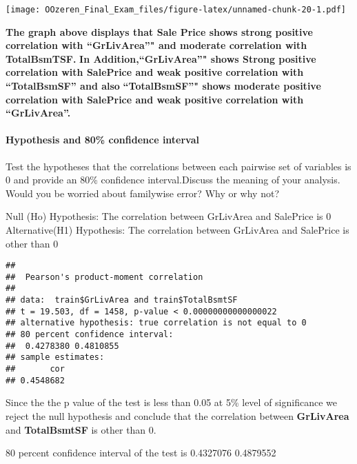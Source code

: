 \documentclass[]{article}
\newenvironment{Shaded}{\begin{snugshade}}{\end{snugshade}}
\newcommand{\KeywordTok}[1]{\textcolor[rgb]{0.13,0.29,0.53}{\textbf{#1}}}
\newcommand{\DataTypeTok}[1]{\textcolor[rgb]{0.13,0.29,0.53}{#1}}
\newcommand{\FloatTok}[1]{\textcolor[rgb]{0.00,0.00,0.81}{#1}}
\newcommand{\OperatorTok}[1]{\textcolor[rgb]{0.81,0.36,0.00}{\textbf{#1}}}
\newcommand{\NormalTok}[1]{#1}
\let\oldparagraph\paragraph
\renewcommand{\paragraph}[1]{\oldparagraph{#1}\mbox{}}
\begin{document}
\texttt{[image: OOzeren\_Final\_Exam\_files/figure-latex/unnamed-chunk-20-1.pdf]}

\textbf{The graph above displays that Sale Price shows strong positive
correlation with ``GrLivArea''" and moderate correlation with
TotalBsmTSF.} \textbf{In Addition,``GrLivArea''" shows Strong positive
correlation with SalePrice and weak positive correlation with
``TotalBsmSF'' and also} \textbf{``TotalBsmSF''" shows moderate positive
correlation with SalePrice and weak positive correlation with
``GrLivArea''.}

\paragraph{Hypothesis and 80\% confidence
interval}\label{hypothesis-and-80-confidence-interval}

Test the hypotheses that the correlations between each pairwise set of
variables is 0 and provide an 80\% confidence interval.Discuss the
meaning of your analysis. Would you be worried about familywise error?
Why or why not?

Null (Ho) Hypothesis: The correlation between GrLivArea and SalePrice is
0 Alternative(H1) Hypothesis: The correlation between GrLivArea and
SalePrice is other than 0

\begin{Shaded}
\end{Shaded}

\begin{verbatim}
## 
##  Pearson's product-moment correlation
## 
## data:  train$GrLivArea and train$TotalBsmtSF
## t = 19.503, df = 1458, p-value < 0.00000000000000022
## alternative hypothesis: true correlation is not equal to 0
## 80 percent confidence interval:
##  0.4278380 0.4810855
## sample estimates:
##       cor 
## 0.4548682
\end{verbatim}

Since the the p value of the test is less than 0.05 at 5\% level of
significance we reject the null hypothesis and conclude that the
correlation between \textbf{GrLivArea} and \textbf{TotalBsmtSF} is other
than 0.

80 percent confidence interval of the test is 0.4327076 0.4879552
\end{document}
